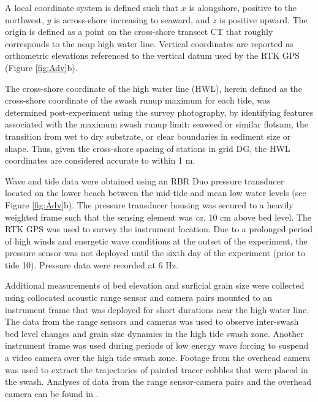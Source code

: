 \documentclass[jmse,article,submit,pdftex,moreauthors]{Definitions/mdpi}
\begin{document}
A local coordinate system is defined such that $x$ is alongshore, positive to the northwest, $y$ is across-shore increasing to seaward, and $z$ is positive upward. The origin is defined as a point on the cross-shore transect CT that roughly corresponds to the neap high water line. Vertical coordinates are reported as orthometric elevations referenced to the vertical datum used by the RTK GPS (Figure \ref{fig:Adv}b).

The cross-shore coordinate of the high water line (HWL), herein defined as the cross-shore coordinate of the swash runup maximum for each tide, was determined post-experiment using the survey photography, by identifying features associated with the maximum swash runup limit: seaweed or similar flotsam, the transition from wet to dry substrate, or clear boundaries in sediment size or shape. Thus, given the cross-shore spacing of stations in grid DG, the HWL coordinates are considered accurate to within 1 m. 

Wave and tide data were obtained using an RBR Duo pressure transducer located on the lower beach between the mid-tide and mean low water levels (see Figure \ref{fig:Adv}b). The pressure transducer housing was secured to a heavily weighted frame such that the sensing element was \textit{ca.} 10 cm above bed level. The RTK GPS was used to survey the instrument location. Due to a prolonged period of high winds and energetic wave conditions at the outset of the experiment, the pressure sensor was not deployed until the sixth day of the experiment (prior to tide 10). Pressure data were recorded at 6 Hz.


Additional measurements of bed elevation and surficial grain size were collected using collocated acoustic range sensor and camera pairs mounted to an instrument frame that was deployed for short durations near the high water line. The data from the range sensors and cameras was used to observe inter-swash bed level changes and grain size dynamics in the high tide swash zone. Another instrument frame was used during periods of low energy wave forcing to suspend a video camera over the high tide swash zone. Footage from the overhead camera was used to extract the trajectories of painted tracer cobbles that were placed in the swash. Analyses of data from the range sensor-camera pairs and the overhead camera can be found in \citet{Guest_Hay2021}.
\end{document}

